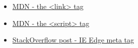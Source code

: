 \begin{itemize}[leftmargin=*]
    \item \href{https://developer.mozilla.org/en-US/docs/Web/HTML/Element/link}{MDN - the <link> tag}
    \item \href{https://developer.mozilla.org/en-US/docs/Web/HTML/Element/script}{MDN - the <script> tag}
    \item \href{https://stackoverflow.com/questions/6771258/what-does-meta-http-equiv-x-ua-compatible-content-ie-edge-do}{StackOverflow post - IE Edge meta tag}
\end{itemize}